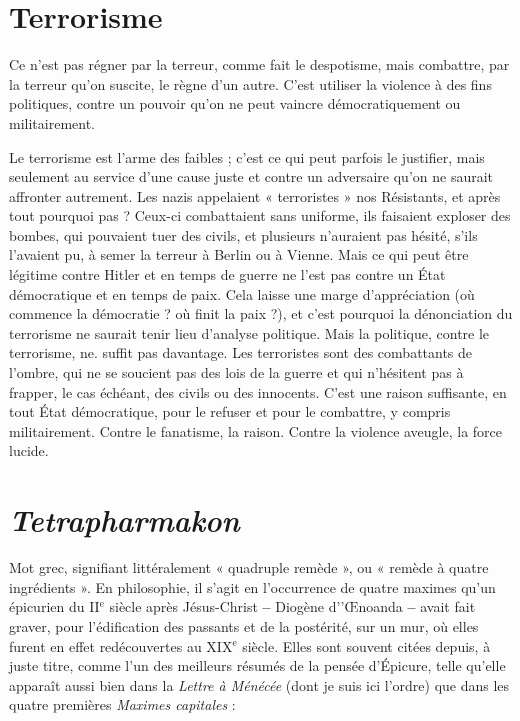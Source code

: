 \section{Terrorisme}
Ce n’est pas régner par la terreur, comme fait le despotisme,
mais combattre, par la terreur qu’on suscite, le règne d’un
autre. C’est utiliser la violence à des fins politiques, contre un pouvoir qu’on ne
peut vaincre démocratiquement ou militairement.

Le terrorisme est l’arme des faibles ; c’est ce qui peut parfois le justifier, mais
seulement au service d’une cause juste et contre un adversaire qu'on ne saurait
affronter autrement. Les nazis appelaient « terroristes » nos Résistants, et après
tout pourquoi pas ? Ceux-ci combattaient sans uniforme, ils faisaient exploser des
bombes, qui pouvaient tuer des civils, et plusieurs n'auraient pas hésité, s’ils
l'avaient pu, à semer la terreur à Berlin ou à Vienne. Mais ce qui peut être légitime
contre Hitler et en temps de guerre ne l’est pas contre un État démocratique
et en temps de paix. Cela laisse une marge d’appréciation (où commence la
démocratie ? où finit la paix ?), et c’est pourquoi la dénonciation du terrorisme ne
saurait tenir lieu d’analyse politique. Mais la politique, contre le terrorisme, ne.
suffit pas davantage. Les terroristes sont des combattants de l'ombre, qui ne se
soucient pas des lois de la guerre et qui n’hésitent pas à frapper, le cas échéant, des
civils ou des innocents. C’est une raison suffisante, en tout État démocratique,
pour le refuser et pour le combattre, y compris militairement. Contre le fanatisme,
la raison. Contre la violence aveugle, la force lucide.

\section{{\it Tetrapharmakon}}
Mot grec, signifiant littéralement « quadruple remède »,
ou « remède à quatre ingrédients ». En philosophie,
il s’agit en l'occurrence de quatre maximes qu’un épicurien du {\footnotesize II$^\text{e}$} siècle après
Jésus-Christ {\bf --} Diogène d’'Œnoanda {\bf --} avait fait graver, pour l'édification des passants
et de la postérité, sur un mur, où elles furent en effet redécouvertes au {\footnotesize XIX$^\text{e}$}
siècle. Elles sont souvent citées depuis, à juste titre, comme l’un des meilleurs
résumés de la pensée d’Épicure, telle qu’elle apparaît aussi bien dans la {\it Lettre à
Ménécée} (dont je suis ici l’ordre) que dans les quatre premières {\it Maximes capitales} :

